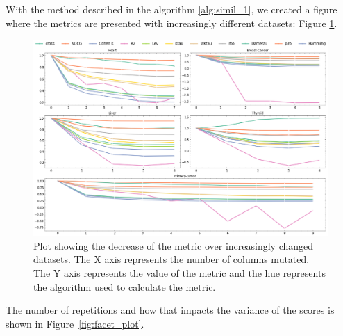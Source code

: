 
With the method described in the algorithm \ref{alg:simil_1}, we created a figure where the metrics are presented with increasingly different datasets: Figure \ref{fig:lineplot}.

\begin{figure}[htbp]
\centering
\caption[Plot showing the variation of different metrics over increasingly changed datasets.]{Plot showing the decrease of the metric over increasingly changed datasets. The X axis represents the number of columns mutated. The Y axis represents the value of the metric and the hue represents the algorithm used to calculate the metric.}\label{fig:lineplot} 
\includegraphics[scale=0.37]{figures/multiple_datasets.png}
\end{figure}

The number of repetitions and how that impacts the variance of the scores is shown in Figure~\ref{fig:facet_plot}.


